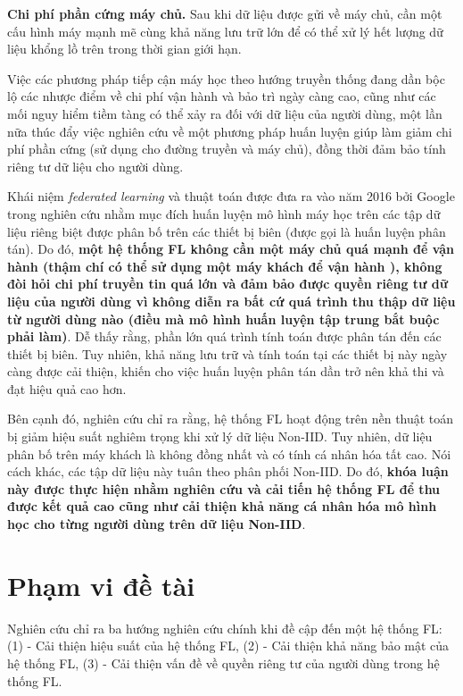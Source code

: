 \textbf{Chi phí phần cứng máy chủ.} Sau khi dữ liệu được gửi về máy chủ, cần một cấu hình máy mạnh mẽ cùng khả năng lưu trữ lớn để có thể xử lý hết lượng dữ liệu khổng lồ trên trong thời gian giới hạn.

Việc các phương pháp tiếp cận máy học theo hướng truyền thống đang dần bộc lộ các nhược điểm về chi phí vận hành và bảo trì ngày càng cao, cũng như các mối nguy hiểm tiềm tàng có thể xảy ra đối với dữ liệu của người dùng, một lần nữa thúc đẩy việc nghiên cứu về một phương pháp huấn luyện giúp làm giảm chi phí phần cứng (sử dụng cho đường truyền và máy chủ), đồng thời đảm bảo tính riêng tư dữ liệu cho người dùng.

Khái niệm \textit{federated learning} và thuật toán  được đưa ra vào năm 2016 bởi Google trong nghiên cứu \cite{mcmahan2017communication} nhằm mục đích huấn luyện mô hình máy học trên các tập dữ liệu riêng biệt được phân bố trên các thiết bị biên (được gọi là huấn luyện phân tán). Do đó, \textbf{một hệ thống FL không cần một máy chủ quá mạnh để vận hành (thậm chí có thể sử dụng một máy khách để vận hành \cite{yin2021comprehensive}), không đòi hỏi chi phí truyền tin quá lớn và đảm bảo được quyền riêng tư dữ liệu của người dùng vì không diễn ra bất cứ quá trình thu thập dữ liệu từ người dùng nào (điều mà mô hình huấn luyện tập trung bắt buộc phải làm)}. Dễ thấy rằng, phần lớn quá trình tính toán được phân tán đến các thiết bị biên. Tuy nhiên, khả năng lưu trữ và tính toán tại các thiết bị này ngày càng được cải thiện, khiến cho việc huấn luyện phân tán dần trở nên khả thi và đạt hiệu quả cao hơn.

Bên cạnh đó, nghiên cứu \cite{zhao2018federated} chỉ ra rằng, hệ thống FL hoạt động trên nền thuật toán  bị giảm hiệu suất nghiêm trọng khi xử lý dữ liệu Non-IID. Tuy nhiên, dữ liệu phân bố trên máy khách là không đồng nhất và có tính cá nhân hóa tất cao. Nói cách khác, các tập dữ liệu này tuân theo phân phối Non-IID. Do đó, \textbf{khóa luận này được thực hiện nhằm nghiên cứu và cải tiến hệ thống FL để thu được kết quả cao cũng như cải thiện khả năng cá nhân hóa mô hình học cho từng người dùng trên dữ liệu Non-IID}.

\section{Phạm vi đề tài}

Nghiên cứu \cite{yin2021comprehensive} chỉ ra ba hướng nghiên cứu chính khi đề cập đến một hệ thống FL: (1) - Cải thiện hiệu suất của hệ thống FL, (2) - Cải thiện khả năng bảo mật của hệ thống FL, (3) - Cải thiện vấn đề về quyền riêng tư của người dùng trong hệ thống FL.

